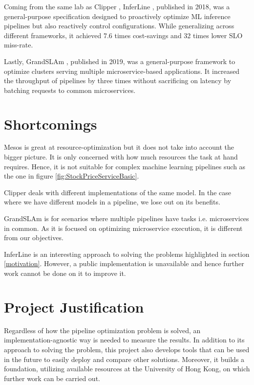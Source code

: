 \documentclass{report}
\begin{document}
Coming from the same lab as Clipper \cite{Clipper}, InferLine \cite{InferLine}, published in 2018, was a general-purpose specification designed to proactively optimize ML inference pipelines but also reactively control configurations. While generalizing across different frameworks, it achieved 7.6 times cost-savings and 32 times lower SLO miss-rate.

Lastly, GrandSLAm \cite{GrandSLAm}, published in 2019, was a general-purpose framework to optimize clusters serving multiple microservice-based applications.
It increased the throughput of pipelines by three times without sacrificing on latency by batching requests to common microservices.

\section{Shortcomings}

Mesos \cite{Mesos} is great at resource-optimization but it does not take into account the bigger picture.
It is only concerned with how much resources the task at hand requires.
Hence, it is not suitable for complex machine learning pipelines such as the one in figure \ref{fig:StockPriceServiceBasic}.

Clipper \cite{Clipper} deals with different implementations of the same model. In the case where we have different models in a pipeline, we lose out on its benefits.

GrandSLAm \cite{GrandSLAm} is for scenarios where multiple pipelines have tasks i.e. microservices in common. As it is focused on optimizing microservice execution, it is different from our objectives.

InferLine \cite{InferLine} is an interesting approach to solving the problems highlighted in section \ref{motivation}.
However, a public implementation is unavailable and hence further work cannot be done on it to improve it.

\section{Project Justification}

Regardless of how the pipeline optimization problem is solved, an implementation-agnostic way is needed to measure the results.
In addition to its approach to solving the problem, this project also develops tools that can be used in the future to easily deploy and compare other solutions.
Moreover, it builds a foundation, utilizing available resources at the University of Hong Kong, on which further work can be carried out.
\end{document}
